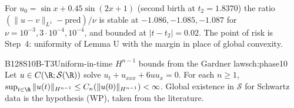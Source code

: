 \begin{caution}[title=Checked on an example]
For $u_0=\sin x+0.45\sin(2x+1)$ (second birth at $t_2=1.8370$) the ratio $(\|u-v\|_{L^1}-\text{pred})/\nu$ is stable at $-1.086,-1.085,-1.087$ for $\nu=10^{-3},3\cdot10^{-4},10^{-4}$, and bounded at $|t-t_2|=0.02$. The point of risk is Step~4: uniformity of Lemma U with the margin in place of global convexity.
\end{caution}

\begin{dimcard}{B128}{S10B-T3}{Uniform-in-time $H^{n-1}$ bounds from the Gardner laws}{\pw}{ch:phase10}
Let $u\in C(\R;\mathcal S(\R))$ solve $u_t+u_{xxx}+6uu_x=0$. For each $n\ge1$, $\sup_{t\in\R}\|u(t)\|_{H^{n-1}}\le C_n(\|u(0)\|_{H^{n-1}})<\infty$. Global existence in $\mathcal S$ for Schwartz data is the hypothesis (WP), taken from the literature.
\end{dimcard}

